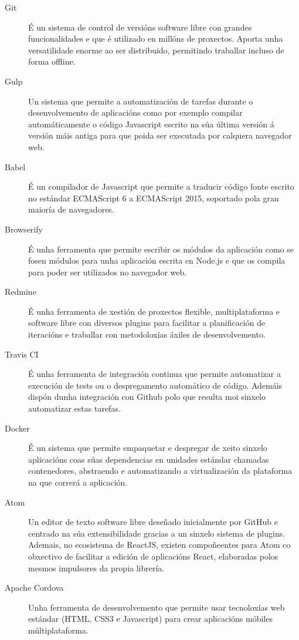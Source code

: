   \begin{description}
   \item [Git]\cite{web:git} É un sistema de control de 
versións software libre con grandes funcionalidades e que é utilizado en 
millóns de proxectos. Aporta unha versatilidade enorme ao ser distribuido, 
permitindo traballar incluso de forma offline.
   \item [Gulp]\cite{web:gulp} Un sistema que permite a 
automatización de tarefas durante o desenvolvemento de aplicacións como por 
exemplo compilar automáticamente o código Javascript escrito na súa última 
versión á versión máis antiga para que poida ser executada por calquera 
navegador web.
    \item [Babel]\cite{web:babel} É un compilador de 
Javascript que permite a traducir código fonte escrito no estándar ECMAScript 6 
a ECMAScript 2015, soportado pola gran maioría de navegadores.
    \item [Browserify]\cite{web:browserify} É unha ferramenta 
que permite escribir os módulos da aplicación como se fosen módulos para unha 
aplicación escrita en Node.js e que os compila para poder ser utilizados no 
navegador web.
   \item [Redmine]\cite{web:redmine} É unha ferramenta de 
xestión de proxectos flexible, multiplataforma e software libre con diversos 
plugins para facilitar a planificación de iteracións e traballar con 
metodoloxías áxiles de desenvolvemento.
   \item [Travis CI]\cite{web:travis} É unha ferramenta de 
integración continua que permite automatizar a execución de tests ou o 
despregamento automático de código. Ademáis dispón dunha integración con Github 
polo que resulta moi sinxelo automatizar estas tarefas.
   \item [Docker]\cite{web:docker} É un sistema que permite 
empaquetar e despregar de xeito sinxelo aplicacións coas súas dependencias en 
unidades estándar chamadas contenedores, abstraendo e automatizando a 
virtualización da plataforma na que correrá a aplicación.
   \item [Atom]\cite{web:atom} Un editor de texto software libre 
deseñado inicialmente por GitHub e centrado na súa extensibilidade gracias a un 
sinxelo sistema de plugins. Ademais, no ecosistema de ReactJS, existen 
compoñeentes para Atom co obxectivo de facilitar a edición de aplicacións React, 
elaboradas polos mesmos impulsores da propia librería.
   \item [Apache Cordova]\cite{web:apachecordova} Unha 
ferramenta de desenvolvemento que permite usar tecnoloxías web estándar (HTML, 
CSS3 e Javascript) para crear aplicacións móbiles múltiplataforma.

  \end{description}

